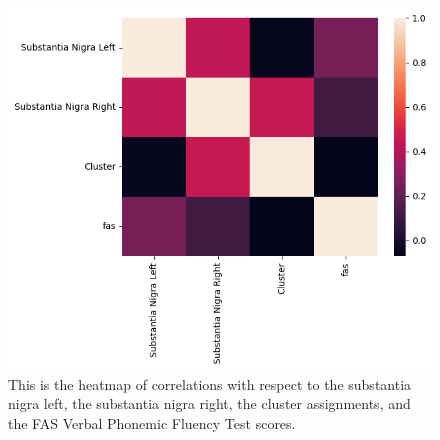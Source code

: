 \documentclass[12pt]{article}
\begin{document}
\begin{figure}[h]  %
    \centering
    \includegraphics[width=\textwidth]{"../img/fALFF_SN_fas_test_correlation_heatmap.png"}  %
    \caption{This is the heatmap of correlations with respect to the substantia nigra left, the substantia nigra right, the cluster assignments, and the FAS Verbal Phonemic Fluency Test scores.}
    \label{fig:heatmap}  %
\end{figure}

\FloatBarrier
\end{document}
